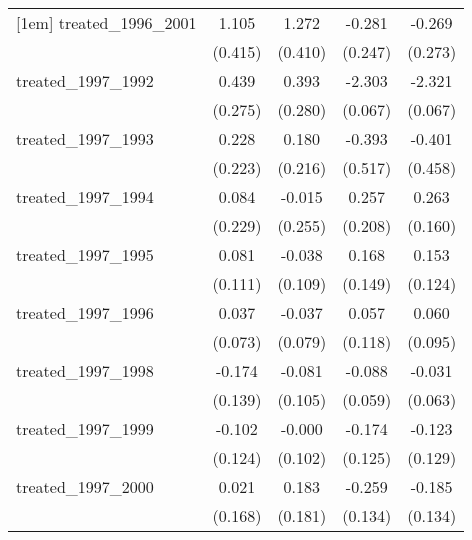 {\begin{tabular}{l*{4}{c}}
[1em]
treated\_1996\_2001&       1.105\sym{**} &       1.272\sym{**} &      -0.281         &      -0.269         \\
            &     (0.415)         &     (0.410)         &     (0.247)         &     (0.273)         \\
[1em]
treated\_1997\_1992&       0.439         &       0.393         &      -2.303\sym{***}&      -2.321\sym{***}\\
            &     (0.275)         &     (0.280)         &     (0.067)         &     (0.067)         \\
[1em]
treated\_1997\_1993&       0.228         &       0.180         &      -0.393         &      -0.401         \\
            &     (0.223)         &     (0.216)         &     (0.517)         &     (0.458)         \\
[1em]
treated\_1997\_1994&       0.084         &      -0.015         &       0.257         &       0.263         \\
            &     (0.229)         &     (0.255)         &     (0.208)         &     (0.160)         \\
[1em]
treated\_1997\_1995&       0.081         &      -0.038         &       0.168         &       0.153         \\
            &     (0.111)         &     (0.109)         &     (0.149)         &     (0.124)         \\
[1em]
treated\_1997\_1996&       0.037         &      -0.037         &       0.057         &       0.060         \\
            &     (0.073)         &     (0.079)         &     (0.118)         &     (0.095)         \\
[1em]
treated\_1997\_1998&      -0.174         &      -0.081         &      -0.088         &      -0.031         \\
            &     (0.139)         &     (0.105)         &     (0.059)         &     (0.063)         \\
[1em]
treated\_1997\_1999&      -0.102         &      -0.000         &      -0.174         &      -0.123         \\
            &     (0.124)         &     (0.102)         &     (0.125)         &     (0.129)         \\
[1em]
treated\_1997\_2000&       0.021         &       0.183         &      -0.259         &      -0.185         \\
            &     (0.168)         &     (0.181)         &     (0.134)         &     (0.134)         \\

\end{tabular}}
